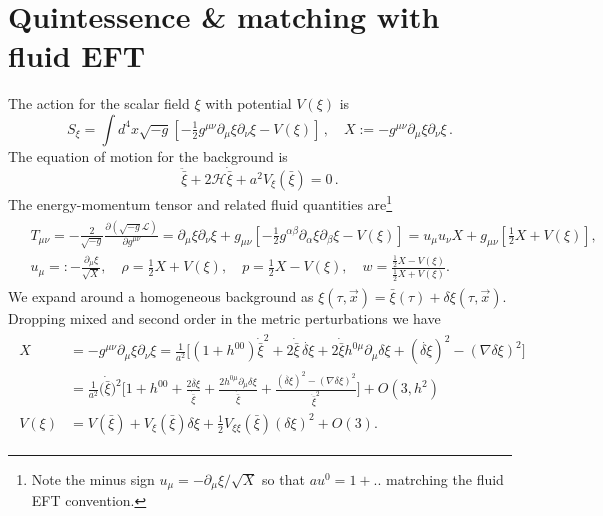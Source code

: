 \section{Quintessence \&  matching with fluid EFT}
%
The action for the scalar field $\xi$ with potential $V(\xi)$ is
\begin{equation}
    S_\xi = \int d^4x \sqrt{-g} \left[-\tfrac{1}{2} g^{\mu\nu}\partial_\mu\xi \partial_\nu\xi - V(\xi)\right]\,, \quad X:= -g^{\mu\nu}\partial_\mu\xi \partial_\nu\xi\,.
\end{equation}
The equation of motion for the background is
\begin{equation}\label{eq:quintessence_bkg_eom}
    \ddot{\bar{\xi}} + 2\mathcal{H}\dot{\bar{\xi}} + a^2 V_\xi(\bar{\xi})=0\,.
\end{equation}
The energy-momentum tensor and related fluid quantities are\footnote{Note the minus sign $u_\mu = -\partial_\mu\xi/\sqrt{X}$ so that $au^0=1+..$ matrching the fluid EFT convention.}
{\small
\begin{align}
\begin{aligned}
    &T_{\mu\nu}=-\tfrac{2}{\sqrt{-g}}\tfrac{\partial \left(\sqrt{-g}\mathcal{L}\right)}{\partial g^{\mu\nu}}
     = \partial_\mu\xi \partial_\nu\xi + g_{\mu\nu}\left[-\tfrac{1}{2}g^{\alpha\beta}\partial_\alpha\xi \partial_\beta\xi - V(\xi)\right]
    = u_\mu u_\nu X + g_{\mu\nu}\left[\tfrac{1}{2}X + V(\xi)\right],\\[3pt]
    &u_\mu =: -\frac{\partial_\mu\xi}{\sqrt{X}}, \quad \rho= \tfrac12 X + V(\xi), \quad p=\tfrac1{2}X - V(\xi), \quad w=\frac{\tfrac1{2}X - V(\xi)}{\tfrac1{2}X + V(\xi)}.
\end{aligned}
\end{align}}
We expand around a homogeneous background as $\xi(\tau,\vec{x})=\bar{\xi}(\tau)+\delta\xi(\tau,\vec{x})$.
Dropping mixed and second order in the metric perturbations we have 
\begin{align}\label{eq:expansion_X_V}
\begin{aligned}
    X&= -g^{\mu\nu}\partial_\mu\xi \partial_\nu\xi
    =\frac{1}{a^2}\bigg[(1+h^{00})\dot{\bar{\xi}}^2 + 2\dot{\bar{\xi}}\, \dot{\delta\xi} + 2\dot{\bar{\xi}}h^{0\mu}\partial_\mu\delta\xi + (\dot{\delta\xi})^2 - (\nabla\delta\xi)^2\bigg]\\
    &= \frac{1}{a^2}\big(\dot{\bar{\xi}}\big)^2\bigg[1+h^{00} + \frac{2\dot{\delta\xi}}{\dot{\bar{\xi}}} + \frac{2h^{0\mu}\partial_\mu\delta\xi}{\dot{\bar{\xi}}} + \frac{(\dot{\delta\xi})^2 - (\nabla\delta\xi)^2}{\dot{\bar{\xi}}^2}\bigg]+O(3,h^2)\\[3pt]
    V(\xi)&= V(\bar{\xi}) + V_\xi(\bar{\xi})\delta\xi + \tfrac12 V_{\xi\xi}(\bar{\xi})(\delta\xi)^2+O(3).
\end{aligned}
\end{align}
